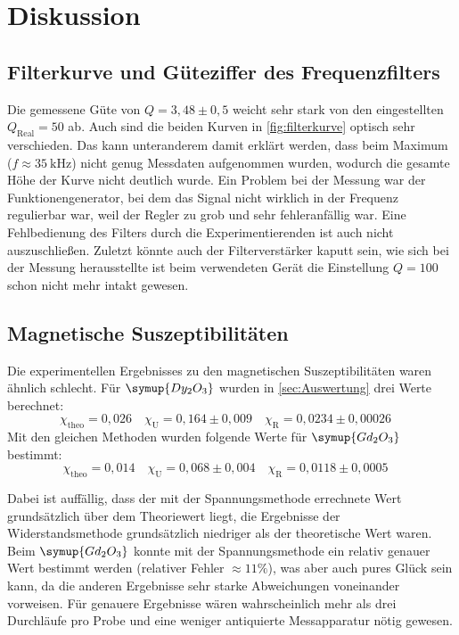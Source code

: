 \section{Diskussion}
\label{sec:Diskussion}

\subsection{Filterkurve und Güteziffer des Frequenzfilters}
\label{sec:Filterkurve und Güteziffer des Frequenzfilters}

Die gemessene Güte von $Q = 3,48 \pm 0,5$ weicht sehr stark von den eingestellten 
$Q_\text{Real} = 50$ ab. Auch sind die beiden Kurven in \autoref{fig:filterkurve} optisch
sehr verschieden. Das kann unteranderem damit erklärt werden, dass beim Maximum ($f
\approx \SI{35}{\kilo\hertz}$) nicht genug Messdaten aufgenommen wurden, wodurch die
gesamte Höhe der Kurve nicht deutlich wurde. Ein Problem bei der Messung war der
Funktionengenerator, bei dem das Signal nicht wirklich in der Frequenz regulierbar war,
weil der Regler zu grob und sehr fehleranfällig war. Eine Fehlbedienung des Filters durch die
Experimentierenden ist auch nicht auszuschließen. Zuletzt könnte auch der Filterverstärker
kaputt sein, wie sich bei der Messung herausstellte ist beim verwendeten Gerät die Einstellung 
$Q = 100$ schon nicht mehr intakt gewesen.

\subsection{Magnetische Suszeptibilitäten}
\label{sec:Magnetische Suszeptibilitäten}

Die experimentellen Ergebnisses zu den magnetischen Suszeptibilitäten waren ähnlich
schlecht. Für $\symup{Dy_2O_3}$ wurden in \autoref{sec:Auswertung} drei Werte berechnet:
\begin{equation}
	\label{eqn:ergebnisse-Dy2O3}
	\chi_\text{theo} = 0,026
	\quad
	\chi_\text{U} = 0,164 \pm 0,009
	\quad
	\chi_\text{R} = 0,0234 \pm 0,00026
	\quad
\end{equation}
Mit den gleichen Methoden wurden folgende Werte für $\symup{Gd_2O_3}$ bestimmt:
\begin{equation}
	\label{eqn:ergebnisse-Gd2O3}
	\chi_\text{theo} = 0,014
	\quad
	\chi_\text{U} = 0,068 \pm 0,004
	\quad
	\chi_\text{R} = 0,0118 \pm 0,0005
	\quad
\end{equation}

Dabei ist auffällig, dass der mit der Spannungsmethode errechnete Wert grundsätzlich 
über dem Theoriewert liegt, die Ergebnisse der Widerstandsmethode grundsätzlich niedriger
als der theoretische Wert waren. Beim $\symup{Gd_2O_3}$ konnte mit der Spannungsmethode
ein relativ genauer Wert bestimmt werden (relativer Fehler $\approx 11\%$),
was aber auch pures Glück sein kann, da die anderen Ergebnisse sehr starke
Abweichungen voneinander vorweisen. Für genauere Ergebnisse wären
wahrscheinlich mehr als drei Durchläufe pro Probe und eine weniger antiquierte Messapparatur 
nötig gewesen.

